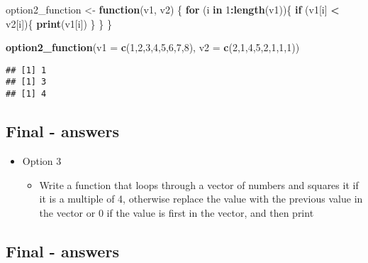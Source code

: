 \documentclass[]{article}
\newenvironment{Shaded}{\begin{snugshade}}{\end{snugshade}}
\newcommand{\KeywordTok}[1]{\textcolor[rgb]{0.13,0.29,0.53}{\textbf{#1}}}
\newcommand{\DataTypeTok}[1]{\textcolor[rgb]{0.13,0.29,0.53}{#1}}
\newcommand{\DecValTok}[1]{\textcolor[rgb]{0.00,0.00,0.81}{#1}}
\newcommand{\StringTok}[1]{\textcolor[rgb]{0.31,0.60,0.02}{#1}}
\newcommand{\ControlFlowTok}[1]{\textcolor[rgb]{0.13,0.29,0.53}{\textbf{#1}}}
\newcommand{\OperatorTok}[1]{\textcolor[rgb]{0.81,0.36,0.00}{\textbf{#1}}}
\newcommand{\NormalTok}[1]{#1}
\providecommand{\tightlist}{%
  \setlength{\itemsep}{0pt}\setlength{\parskip}{0pt}}
\begin{document}
\begin{Shaded}
\begin{Highlighting}[]
\NormalTok{option2_function <-}\StringTok{ }\ControlFlowTok{function}\NormalTok{(v1, v2) \{}
  \ControlFlowTok{for}\NormalTok{ (i }\ControlFlowTok{in} \DecValTok{1}\OperatorTok{:}\KeywordTok{length}\NormalTok{(v1))\{}
    \ControlFlowTok{if}\NormalTok{ (v1[i] }\OperatorTok{<}\StringTok{ }\NormalTok{v2[i])\{}
      \KeywordTok{print}\NormalTok{(v1[i])}
\NormalTok{      \}}
\NormalTok{  \}}
\NormalTok{\}}

\KeywordTok{option2_function}\NormalTok{(}\DataTypeTok{v1 =} \KeywordTok{c}\NormalTok{(}\DecValTok{1}\NormalTok{,}\DecValTok{2}\NormalTok{,}\DecValTok{3}\NormalTok{,}\DecValTok{4}\NormalTok{,}\DecValTok{5}\NormalTok{,}\DecValTok{6}\NormalTok{,}\DecValTok{7}\NormalTok{,}\DecValTok{8}\NormalTok{), }\DataTypeTok{v2 =} \KeywordTok{c}\NormalTok{(}\DecValTok{2}\NormalTok{,}\DecValTok{1}\NormalTok{,}\DecValTok{4}\NormalTok{,}\DecValTok{5}\NormalTok{,}\DecValTok{2}\NormalTok{,}\DecValTok{1}\NormalTok{,}\DecValTok{1}\NormalTok{,}\DecValTok{1}\NormalTok{))}
\end{Highlighting}
\end{Shaded}

\begin{verbatim}
## [1] 1
## [1] 3
## [1] 4
\end{verbatim}

\subsection{Final - answers}\label{final---answers-2}

\begin{itemize}
\tightlist
\item
  Option 3

  \begin{itemize}
  \tightlist
  \item
    Write a function that loops through a vector of numbers and squares
    it if it is a multiple of 4, otherwise replace the value with the
    previous value in the vector or 0 if the value is first in the
    vector, and then print
  \end{itemize}
\end{itemize}

\subsection{Final - answers}\label{final---answers-3}
\end{document}
